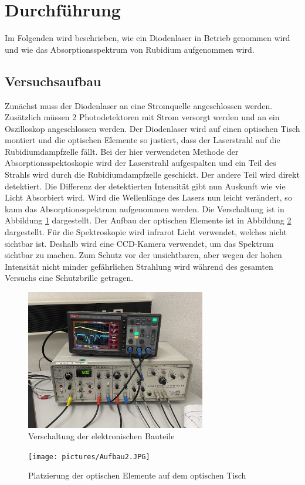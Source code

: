 \section{Durchführung}
\label{sec:Durchführung}
Im Folgenden wird beschrieben, wie ein Diodenlaser in Betrieb genommen wird und wie das Absorptionsspektrum von Rubidium aufgenommen wird.
\subsection{Versuchsaufbau}
Zunächst muss der Diodenlaser an eine Stromquelle angeschlossen werden. Zusätzlich müssen 2 Photodetektoren mit Strom versorgt werden und 
an ein Oszilloskop angeschlossen werden. Der Diodenlaser wird auf einen optischen Tisch montiert und die optischen Elemente so justiert, dass
der Laserstrahl auf die Rubidiumdampfzelle fällt. Bei der hier verwendeten Methode der Absorptionsspektoskopie wird der Laserstrahl aufgespalten
und ein Teil des Strahls wird durch die Rubidiumdampfzelle geschickt. Der andere Teil wird direkt detektiert. Die Differenz der detektierten Intensität 
gibt nun Auskunft wie vie Licht Absorbiert wird. Wird die Wellenlänge des Lasers nun leicht verändert, so kann das Absorptionsspektrum aufgenommen werden.
Die Verschaltung ist in Abbildung \ref{fig:versuchsaufbau} dargestellt. Der Aufbau der optischen Elemente ist in Abbildung \ref{fig:optische_elemente} dargestellt.
Für die Spektroskopie wird infrarot Licht verwendet, welches nicht sichtbar ist. Deshalb wird eine CCD-Kamera verwendet, um das Spektrum sichtbar zu machen.
Zum Schutz vor der unsichtbaren, aber wegen der hohen Intensität nicht minder gefährlichen Strahlung wird während des gesamten Versuchs eine Schutzbrille getragen.
\begin{figure}[H]
    \centering
    \includegraphics[width=0.7\textwidth]{pictures/Aufbau.JPG}
    \caption{Verschaltung der elektronischen Bauteile}
    \label{fig:versuchsaufbau}
\end{figure}
\begin{figure}[H]
    \centering
    \texttt{[image: pictures/Aufbau2.JPG]}
    \caption{Platzierung der optischen Elemente auf dem optischen Tisch}
    \label{fig:optische_elemente}
\end{figure}
